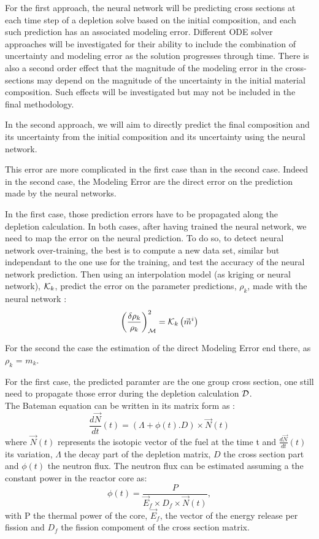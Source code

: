 \documentclass[dvips,12pt]{article}
\begin{document}
For the first approach, the neural network will be
predicting cross sections at each time step of a
depletion solve based on the initial composition,
and each such prediction has an associated
modeling error.  Different ODE solver approaches
will be investigated for their ability to include
the combination of uncertainty and modeling error
as the solution progresses through time.  There is
also a second order effect that the magnitude of
the modeling error in the cross-sections may
depend on the magnitude of the uncertainty in the
initial material composition.  Such effects will
be investigated but may not be included in the
final methodology.

In the second approach, we will aim to directly
predict the final composition and its uncertainty
from the initial composition and its uncertainty
using the neural network.


This error are more complicated in the first case
than in the second case. Indeed in the second case,
the Modeling Error are the direct error on the
prediction made by the neural networks.


In the first case, those prediction errors have to
be propagated along the depletion calculation.
In both cases, after having trained the neural
network, we need to map the error on the neural
prediction.
To do so, to detect neural network over-training,
the best is to compute a new data set, similar but
independant to the one use for the training, and
test the accuracy of the neural network prediction.
Then using an interpolation model (as kriging or
neural network), ${\cal K}_k$,  predict the error
on the parameter predictions, $\rho_k$, made with
the neural network :
\begin{equation}
  \left( \frac{\delta \rho_k}{\rho_k} \right)^{2} _{{\cal M}} = {\cal K}_k \left( \vec{m}^{i} \right)
\end{equation}

For the second the case the estimation of the
direct Modeling Error end there, as $\rho_k$ = $m_k$.

For the first case, the predicted paramter are the
one group cross section, one still need to
propagate those error during the depletion
calculation ${\cal D}$.\\
The Bateman equation can be written in its matrix
form as :
\begin{equation}
  \frac{d\vec{N}}{dt}(t) = (\Lambda + \phi(t) . D) \times \vec{N}(t)
\end{equation}
where $\vec{N}(t)$ represents the isotopic vector
of the fuel at the time t and
$\frac{d\vec{N}}{dt}(t)$ its variation, $\Lambda$
the decay part of the depletion matrix, $D$ the
cross section part and $\phi(t)$ the neutron flux.
The neutron flux can be estimated assuming a the
constant power in the reactor core as:
\begin{equation}
  \phi(t) = \frac{P}{ \vec{E}_f \times D_f \times \vec{N}(t)},
\end{equation}
with P the thermal power of the core, $\vec{E}_f$,
the vector of the energy release per fission and
$D_f$ the fission compoment of the cross section
matrix.
\end{document}
